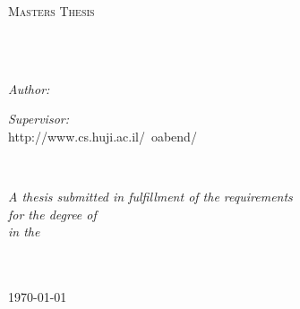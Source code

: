 \documentclass[
11pt, %
oneside, %
hebrew, english,
singlespacing, %
nohyperref, %
headsepline, %
]{MastersDoctoralThesis} %
\author{Aviram \textsc{Stern}} %
\newcommand{\href}[1]{#1}
\begin{document}
\frontmatter %

\pagestyle{plain} %


\begin{titlepage}
\begin{center}

\vspace*{.06\textheight}
{\scshape\LARGE \univname\par}\vspace{1.5cm} %
\textsc{\Large Masters Thesis}\\[0.5cm] %

\HRule \\[0.4cm] %
{\huge \bfseries \ttitle\par}\vspace{0.4cm} %
\HRule \\[1.5cm] %
 
\begin{minipage}[t]{0.4\textwidth}
\begin{flushleft} \large
\emph{Author:}\\
{\authorname} %
\end{flushleft}
\end{minipage}
\begin{minipage}[t]{0.4\textwidth}
\begin{flushright} \large
\emph{Supervisor:} \\
\href{http://www.cs.huji.ac.il/~oabend/}{\supname} %
\end{flushright}
\end{minipage}\\[3cm]
 
\vfill

\large \textit{A thesis submitted in fulfillment of the requirements\\ for the degree of \degreename}\\[0.3cm] %
\textit{in the}\\[0.4cm]
\groupname\\\deptname\\[2cm] %
 
\vfill

{\large \today}\\[4cm] %
 
\vfill
\end{center}
\end{titlepage}
\end{document}
